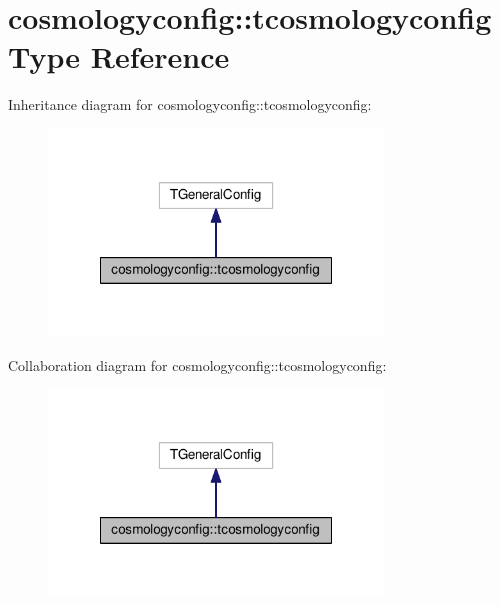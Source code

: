 \hypertarget{structcosmologyconfig_1_1tcosmologyconfig}{}\section{cosmologyconfig\+:\+:tcosmologyconfig Type Reference}
\label{structcosmologyconfig_1_1tcosmologyconfig}


Inheritance diagram for cosmologyconfig\+:\+:tcosmologyconfig\+:
\nopagebreak
\begin{figure}[H]
\begin{center}
\leavevmode
\includegraphics[width=252pt]{structcosmologyconfig_1_1tcosmologyconfig__inherit__graph}
\end{center}
\end{figure}


Collaboration diagram for cosmologyconfig\+:\+:tcosmologyconfig\+:
\nopagebreak
\begin{figure}[H]
\begin{center}
\leavevmode
\includegraphics[width=252pt]{structcosmologyconfig_1_1tcosmologyconfig__coll__graph}
\end{center}
\end{figure}
